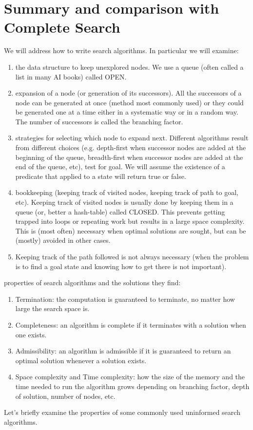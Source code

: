 \documentclass[../main.tex]{subfiles}
\begin{document}
\section{Summary and comparison with Complete Search}
We will address how to write search algorithms. In particular we will examine:
\begin{enumerate}
\item the data structure to keep unexplored nodes. We use a queue (often called a list in many AI books) called OPEN.
\item expansion of a node (or generation of its successors). All the successors of a node can be generated at once (method most commonly used) or they could be generated one at a time either in a systematic way or in a random way. The number of successors is called the branching factor.
\item strategies for selecting which node to expand next. Different algorithms result from different choices (e.g. depth-first when successor nodes are added at the beginning of the queue, breadth-first when successor nodes are added at the end of the queue, etc),
        test for goal. We will assume the existence of a predicate that applied to a state will return true or false.
\item bookkeeping (keeping track of visited nodes, keeping track of path to goal, etc). Keeping track of visited nodes is usually done by keeping them in a queue (or, better a hash-table) called CLOSED. This prevents getting trapped into loops or repeating work but results in a large space complexity. This is (most often) necessary when optimal solutions are sought, but can be (mostly) avoided in other cases.
\item Keeping track of the path followed is not always necessary (when the problem is to find a goal state and knowing how to get there is not important).
\end{enumerate}
    properties of search algorithms and the solutions they find:
\begin{enumerate}

\item Termination: the computation is guaranteed to terminate, no matter how large the search space is.
\item Completeness: an algorithm is complete if it terminates with a solution when one exists.
\item Admissibility: an algorithm is admissible if it is guaranteed to return an optimal solution whenever a solution exists.
\item Space complexity and Time complexity: how the size of the memory and the time needed to run the algorithm grows depending on branching factor, depth of solution, number of nodes, etc. 
\end{enumerate}
    Let's briefly examine the properties of some commonly used uninformed search algorithms.
\end{document}
